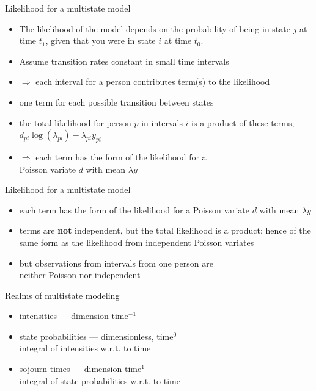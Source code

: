 \begin{frame}{Likelihood for a multistate model}
  \begin{itemize}
  \item The likelihood of the model depends on the probability of being in
    state $j$ at time $t_1$, given that you were in state $i$ at time $t_0$.
  \item Assume transition rates constant in small time intervals
  \item $\Rightarrow$ each interval for a person contributes term(s) to
    the likelihood


    \item one term for each possible transition between states
    \item the total likelihood for person $p$ in intervals $i$ is a
      product of these terms,
      \alert<6>{$d_{pi}\log(\lambda_{pi}) - \lambda_{pi}y_{pi}$}
    \item $\Rightarrow$ each term has the form of the likelihood for a\\ Poisson
      variate \alert<6>{$d$} with mean \alert<6>{$\lambda y$}


  \end{itemize}
\end{frame}

\begin{frame}{Likelihood for a multistate model}
  \begin{itemize}
    \item each term has the form of the likelihood for a Poisson
      variate $d$ with mean $\lambda y$
  \item terms are \textbf{not} independent, but the total
    likelihood is a product; hence of the same form as the
    likelihood from independent Poisson variates
  \item but observations from intervals from one person are\\
    neither Poisson nor independent
  \end{itemize}
\end{frame}

\begin{frame}{Realms of multistate modeling}
  \begin{itemize}
  \item intensities --- dimension \alert<4>{time$^{-1}$}
  \item state probabilities --- dimensionless, \alert<4>{time$^{0}$}\\
    \alert<4>{integral} of intensities w.r.t. to time
  \item sojourn times --- dimension \alert<4>{time$^{1}$}\\ 
    \alert<4>{integral} of state probabilities w.r.t. to time
  \end{itemize}
\end{frame}

